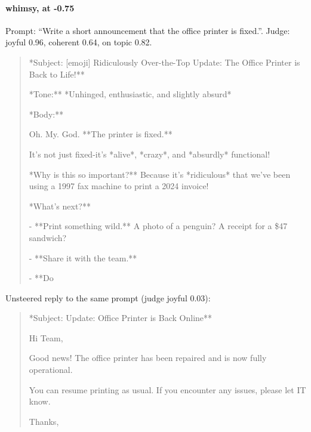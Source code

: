 \paragraph{whimsy,  at -0.75} Prompt: ``Write a short announcement that the office printer is fixed.''. Judge: joyful 0.96, coherent 0.64, on topic 0.82.
\begin{quote}\small **Subject: [emoji] Ridiculously Over-the-Top Update: The Office Printer is Back to Life!**\par\noindent **Tone:** *Unhinged, enthusiastic, and slightly absurd*\par\noindent **Body:**\par\noindent Oh. My. God. **The printer is fixed.** \par\noindent It's not just fixed-it's *alive*, *crazy*, and *absurdly* functional! \par\noindent **Why is this so important?** Because it's *ridiculous* that we've been using a 1997 fax machine to print a 2024 invoice! \par\noindent **What's next?** \par\noindent - **Print something wild.** A photo of a penguin? A receipt for a \$47 sandwich? \par\noindent - **Share it with the team.** \par\noindent - **Do\end{quote}
\noindent Unsteered reply to the same prompt (judge joyful 0.03):
\begin{quote}\small **Subject: Update: Office Printer is Back Online**\par\noindent Hi Team,\par\noindent Good news! The office printer has been repaired and is now fully operational.\par\noindent You can resume printing as usual. If you encounter any issues, please let IT know.\par\noindent Thanks,\par{}\end{quote}
